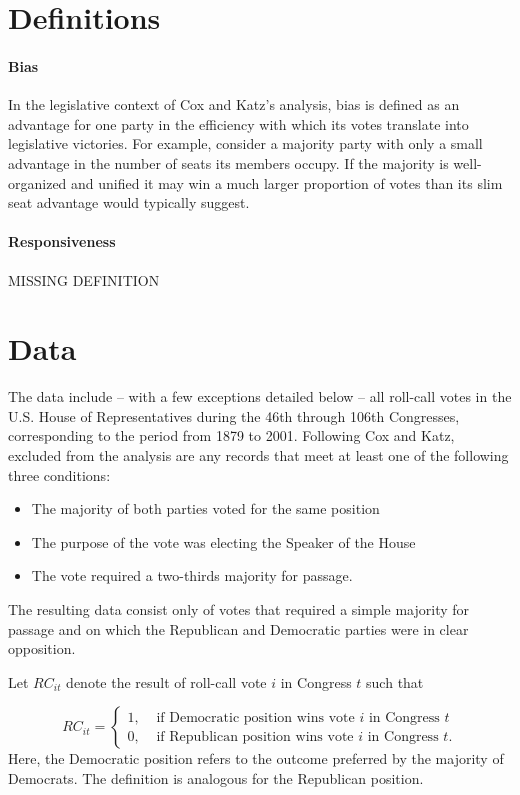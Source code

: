 \section{Definitions}


\paragraph{Bias}
In the legislative context of Cox and Katz's analysis, bias is defined as an advantage for one party in the efficiency with which its votes translate into legislative victories. For example, consider a majority party with only a small advantage in the number of seats its members occupy. If the majority is well-organized and unified it may win a much larger proportion of votes than its slim seat advantage would typically suggest. 

\paragraph{Responsiveness} MISSING DEFINITION


\section{Data}

The data include -- with a few exceptions detailed below -- all roll-call votes in the U.S. House of Representatives during the 46th through 106th Congresses, corresponding to the period from 1879 to 2001.  Following Cox and Katz, excluded from the analysis are any records that meet at least one of the following three conditions:

\begin{itemize}
\singlespacing
\item The majority of both parties voted for the same position 
\item The purpose of the vote was electing the Speaker of the House
\item The vote required a two-thirds majority for passage.
\end{itemize}

The resulting data consist only of votes that required a simple majority for passage and on which the Republican and Democratic parties were in clear opposition. 

Let $RC_{it}$ denote the result of roll-call vote $i$ in Congress $t$ such that 

{\singlespacing
$$ RC_{it} =
\begin{cases} 
1, & \text{ if Democratic position wins vote $i$ in Congress $t$} \\
0, & \text{ if Republican position wins vote $i$ in Congress $t$.}
\end{cases}
$$
}
%
Here, the Democratic position refers to the outcome preferred by the majority of Democrats.  The definition is analogous for the Republican position.

